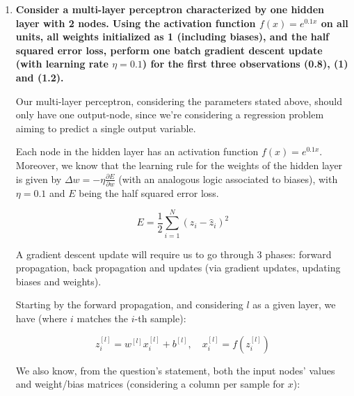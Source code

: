 \documentclass[12pt]{article}
\begin{document}
\begin{enumerate}[leftmargin=\labelsep]
        \pagebreak

  \item \textbf{Consider a multi-layer perceptron characterized by one hidden layer with 2 nodes.
          Using the activation function $f(x) = e^{0.1x}$ on all units, all weights
          initialized as 1 (including biases), and the half squared error loss, perform
          one batch gradient descent update (with learning rate $\eta = 0.1$)
          for the first three observations (0.8), (1) and (1.2).
        }

        Our multi-layer perceptron, considering the parameters stated above, should only
        have one output-node, since we're considering a regression problem aiming to
        predict a single output variable.

        Each node in the hidden layer has an activation function $f(x) = e^{0.1x}$.
        Moreover, we know that the learning rule for the weights of the hidden layer
        is given by $\Delta w = - \eta \frac{\partial E}{\partial w}$ (with an analogous
        logic associated to biases), with $\eta = 0.1$ and $E$ being the half squared error loss.

        \begin{equation*}
          E = \frac{1}{2} \sum_{i=1}^N (z_i - \hat{z}_i)^2
        \end{equation*}

        A gradient descent update will require us to go through 3 phases: forward
        propagation, back propagation and updates (via gradient updates, updating
        biases and weights).

        Starting by the forward propagation, and considering $l$ as a given layer,
        we have (where $i$ matches the $i$-th sample):

        \begin{equation*}
          z_i^{[l]} = w^{[l]} x_i^{[l]} + b^{[l]}, \quad x_i^{[l]} = f(z_i^{[l]})
        \end{equation*}

        We also know, from the question's statement, both the input nodes' values
        and weight/bias matrices (considering a column per sample for $x$):


\end{enumerate}
\end{document}

